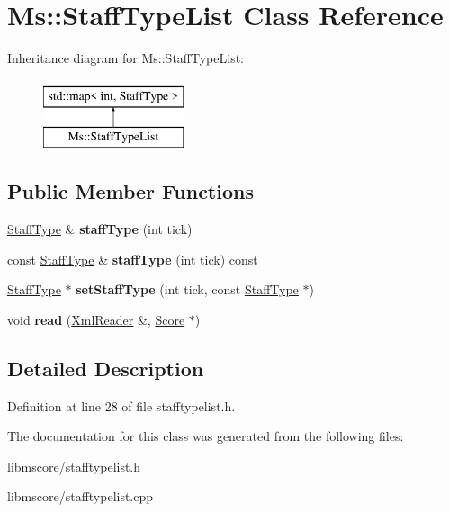 \hypertarget{class_ms_1_1_staff_type_list}{}\section{Ms\+:\+:Staff\+Type\+List Class Reference}
\label{class_ms_1_1_staff_type_list}
Inheritance diagram for Ms\+:\+:Staff\+Type\+List\+:\begin{figure}[H]
\begin{center}
\leavevmode
\includegraphics[height=2.000000cm]{class_ms_1_1_staff_type_list}
\end{center}
\end{figure}
\subsection*{Public Member Functions}
\begin{DoxyCompactItemize}
\item 
\mbox{\label{class_ms_1_1_staff_type_list_a8b1f73c963fde64ab0db44eeb6a21e2b}} 
\hyperlink{class_ms_1_1_staff_type}{Staff\+Type} \& {\bfseries staff\+Type} (int tick)
\item 
\mbox{\label{class_ms_1_1_staff_type_list_ab63a0c6b2743642f5bcd017e2885bd11}} 
const \hyperlink{class_ms_1_1_staff_type}{Staff\+Type} \& {\bfseries staff\+Type} (int tick) const
\item 
\mbox{\label{class_ms_1_1_staff_type_list_aaeb1b4d3455da5c3d4e99dcf27666779}} 
\hyperlink{class_ms_1_1_staff_type}{Staff\+Type} $\ast$ {\bfseries set\+Staff\+Type} (int tick, const \hyperlink{class_ms_1_1_staff_type}{Staff\+Type} $\ast$)
\item 
\mbox{\label{class_ms_1_1_staff_type_list_a12aadfb9724d5104c4289150bf391480}} 
void {\bfseries read} (\hyperlink{class_ms_1_1_xml_reader}{Xml\+Reader} \&, \hyperlink{class_ms_1_1_score}{Score} $\ast$)
\end{DoxyCompactItemize}


\subsection{Detailed Description}


Definition at line 28 of file stafftypelist.\+h.



The documentation for this class was generated from the following files\+:\begin{DoxyCompactItemize}
\item 
libmscore/stafftypelist.\+h\item 
libmscore/stafftypelist.\+cpp\end{DoxyCompactItemize}
